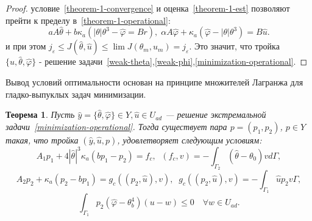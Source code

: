 \documentclass[10pt]{article}
\newtheorem{thm}{\indent Теорема}
\begin{document}
\begin{proof}
        условие~\eqref{theorem-1-convergence} и оценка~\eqref{theorem-1-est} позволяют прейти
        к пределу в~\eqref{theorem-1-operational}:
        \[
            a A \hat{\theta} + b \kappa_a (|\theta|\theta^3 - \hat{\varphi} = Br), \;
            \alpha A \hat{\varphi} + \kappa_a (\hat{\varphi} -|\theta|\theta^3) = B \hat{u}.
        \]
        и при этом $j_\varepsilon \leq J(\hat{\theta}, \hat{u}) \leq \lim J(\theta_m, u_m) =
        j_\varepsilon$.
        Это значит, что тройка $\{ \hat{u}, \hat{\theta}, \hat{\varphi} \}$ -
        решение задачи~\eqref{weak-theta},\eqref{weak-phi},\eqref{minimization-operational}.
    \end{proof}

    Вывод условий оптимальности основан на принципе множителей
    Лагранжа для гладко-выпуклых задач минимизации.
    \begin{thm}
        \label{adjoint_theorem}
        Пусть $\hat{y}=\{\hat{\theta},\hat{\varphi} \} \in Y, \hat{u} \in U_{ad}$ --- решение
        экстремальной задачи~\eqref{minimization-operational}.
        Тогда существует пара $p = (p_1, p_2)$, $p \in Y$
        такая, что тройка $(\hat{y}, \hat{u}, p)$, удовлетворяет следующим условиям:
        \begin{equation}
            \label{theorem_2_eq1}
            A_1 p_1 + 4 |\hat{\theta}|^3 \kappa_a(b p_1 - p_2) = f_c, \;\;
            (f_c,v) = - \int_{\Gamma_2} (\hat{\theta} - \theta_0) v d\Gamma,
        \end{equation}
        \begin{equation}
            \label{theorem_2_eq2}
            A_2 p_2 + \kappa_a (p_2-b p_1) = g_c(( p_2, \hat{u}),v), \;\;
            g_c(( p_2, \hat{u}),v) = -\int_{\Gamma_1} \hat{u} p_2 v\Gamma,
        \end{equation}
        \begin{equation}
            \label{theorem_2_eq3}
            \int_{\Gamma_1} p_2 (\hat{\varphi} - \theta_b^4)(u-w) \leq 0
            \quad \forall w \in U_{ad}.
        \end{equation}
    \end{thm}
\end{document}
